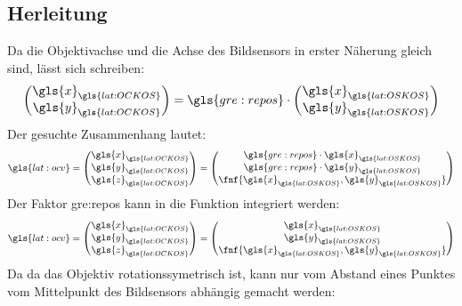 \subsection{Herleitung}
Da die Objektivachse und die Achse des Bildsensors in erster Näherung gleich sind, lässt sich schreiben:
\begin{equation}
\begin{pmatrix}
\gls{x}_{\gls{lat:OCKOS}} \\ \gls{y}_{\gls{lat:OCKOS}}
\end{pmatrix}
= \gls{gre:repos} \cdot
\begin{pmatrix}
\gls{x}_{\gls{lat:OSKOS}} \\ \gls{y}_{\gls{lat:OSKOS}}
\end{pmatrix}
\end{equation}
Der gesuchte Zusammenhang lautet: 
\begin{equation}
\gls{lat:ocv} =
\begin{pmatrix}
\gls{x}_{\gls{lat:OCKOS}} \\ \gls{y}_{\gls{lat:OCKOS}} \\ \gls{z}_{\gls{lat:OCKOS}}
\end{pmatrix}
=
\begin{pmatrix}
\gls{gre:repos} \cdot \gls{x}_{\gls{lat:OSKOS}} \\  \gls{gre:repos} \cdot \gls{y}_{\gls{lat:OSKOS}} \\ \fnf{\gls{x}_{\gls{lat:OSKOS}},\gls{y}_{\gls{lat:OSKOS}}}
\end{pmatrix}
\end{equation}
Der Faktor  \gls{gre:repos} kann in die Funktion  integriert werden:
\begin{equation}
\label{eq:ocamcalibuv}
\gls{lat:ocv} =
\begin{pmatrix}
\gls{x}_{\gls{lat:OCKOS}} \\ \gls{y}_{\gls{lat:OCKOS}} \\ \gls{z}_{\gls{lat:OCKOS}}
\end{pmatrix}
=
\begin{pmatrix}
\gls{x}_{\gls{lat:OSKOS}} \\ \gls{y}_{\gls{lat:OSKOS}} \\ \fnf{\gls{x}_{\gls{lat:OSKOS}},\gls{y}_{\gls{lat:OSKOS}}}
\end{pmatrix}
\end{equation}
Da da das Objektiv rotationssymetrisch ist, kann  nur vom Abstand eines Punktes vom Mittelpunkt des Bildsensors abhängig gemacht werden:
